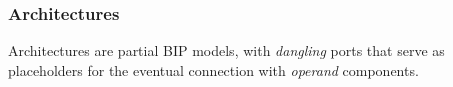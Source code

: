 \documentclass{llncs}
\newcommand{\Ludo}{\\\hfill\mdash Ludo}
\newcommand{\noteLH}[2][color=orange!40, size=\tiny]{\todo[#1]{{#2}\Ludo}}
\newcommand{\noteLHin}[2][inline,color=orange!40]{\todo[#1]{{#2}\Ludo}}
\newcommand{\mdash}[1][]{---#1}
\begin{document}





\subsubsection{Architectures}
\label{secn:archi}

Architectures are partial BIP models, with \emph{dangling}
ports that serve as placeholders for the eventual connection with
 \emph{operand} components.



\end{document}
